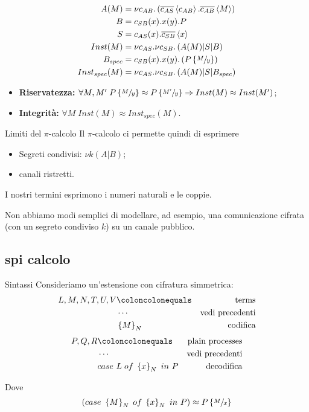 \documentclass{beamer}
\theoremstyle{plain}
\theoremstyle{definition}
\theoremstyle{remark}
\newcommand{\obar}[1]{\overline{#1}}
\newcommand{\set}[1]{\left\{#1\right\}}
\newcommand{\pa}[1]{\left(#1\right)}
\newcommand{\ang}[1]{\left<#1\right>}
\begin{document}
\begin{frame}
  \begin{align*}
    A(M) & = \nu
           c_{AB}. \pa{\obar{c_{AS}}\ang{c_{AB}}. \obar{c_{AB}}\ang{M}}
    \\
    B & = c_{SB}(x). x(y) .P \\
    S & = c_{AS}(x) . \obar{c_{SB}} \ang{x} \\
    Inst(M) & = \nu c_{AS}. \nu c_{SB}. \pa{ A(M) | S | B} \\
    B_{spec} & = c_{SB}(x). x(y). \pa{ P\set{\sfrac{M}{y}}} \\ 
    Inst_{spec}(M) & = \nu c_{AS}. \nu c_{SB}. \pa{ A(M) | S | B_{spec}}
  \end{align*}
  \begin{itemize}
  \item \textbf{Riservatezza:} $\forall M,M'\; P\set{\sfrac{M}{y}}
    \approx P\set{\sfrac{M'}{y}} \Rightarrow Inst(M) \approx Inst(M')$;
  \item \textbf{Integrit\`a:} $\forall M \; Inst(M) \approx
    Inst_{spec}(M)$.
  \end{itemize}
\end{frame}

\begin{frame}{Limiti del $\pi$-calcolo}
  Il $\pi$-calcolo ci permette quindi di esprimere
  \begin{itemize}
  \item Segreti condivisi: $\nu k ( A|B)$;
  \item canali ristretti.
  \end{itemize}
  I nostri termini esprimono i numeri naturali e le
  coppie. 
  \vfill

  Non abbiamo modi semplici di modellare, ad esempio, una
  comunicazione cifrata (con un segreto condiviso $k$) su un canale
  pubblico.
\end{frame}

\subsection{spi calcolo}

\begin{frame}{Sintassi}
  Consideriamo un'estensione con cifratura simmetrica:
  \begin{align*}
    L,M,N,T,U,V & \coloncolonequals & \text{terms} \\
                & \cdots & \text{vedi precedenti} \\
                & \set{M}_N & \text{codifica}
  \end{align*}
  \begin{align*}
    P,Q,R & \coloncolonequals & \text{plain processes} \\
          & \cdots & \text{vedi precedenti} \\
          & case\ L\; of\; \set{x}_N\ in\ P & \text{decodifica}
  \end{align*}

  Dove
  \[ \pa{ case\ \set{M}_N\; of\; \set{x}_N\ in\ P} \approx
    P\set{\sfrac{M}{x}} \]
\end{frame}
\end{document}
